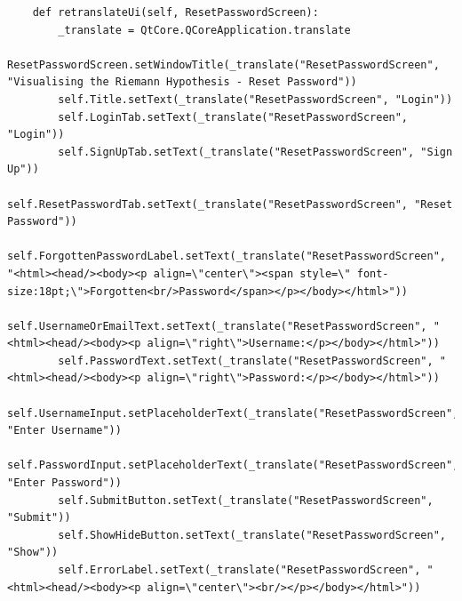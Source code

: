 \documentclass[12pt]{article}
\begin{document}
\begin{lstlisting}
    def retranslateUi(self, ResetPasswordScreen):
        _translate = QtCore.QCoreApplication.translate
        ResetPasswordScreen.setWindowTitle(_translate("ResetPasswordScreen", "Visualising the Riemann Hypothesis - Reset Password"))
        self.Title.setText(_translate("ResetPasswordScreen", "Login"))
        self.LoginTab.setText(_translate("ResetPasswordScreen", "Login"))
        self.SignUpTab.setText(_translate("ResetPasswordScreen", "Sign Up"))
        self.ResetPasswordTab.setText(_translate("ResetPasswordScreen", "Reset Password"))
        self.ForgottenPasswordLabel.setText(_translate("ResetPasswordScreen", "<html><head/><body><p align=\"center\"><span style=\" font-size:18pt;\">Forgotten<br/>Password</span></p></body></html>"))
        self.UsernameOrEmailText.setText(_translate("ResetPasswordScreen", "<html><head/><body><p align=\"right\">Username:</p></body></html>"))
        self.PasswordText.setText(_translate("ResetPasswordScreen", "<html><head/><body><p align=\"right\">Password:</p></body></html>"))
        self.UsernameInput.setPlaceholderText(_translate("ResetPasswordScreen", "Enter Username"))
        self.PasswordInput.setPlaceholderText(_translate("ResetPasswordScreen", "Enter Password"))
        self.SubmitButton.setText(_translate("ResetPasswordScreen", "Submit"))
        self.ShowHideButton.setText(_translate("ResetPasswordScreen", "Show"))
        self.ErrorLabel.setText(_translate("ResetPasswordScreen", "<html><head/><body><p align=\"center\"><br/></p></body></html>"))
\end{lstlisting}
\end{document}
